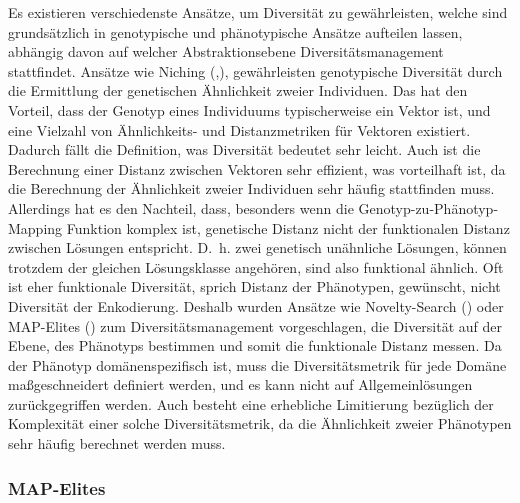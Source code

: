 Es existieren verschiedenste Ansätze, um Diversität zu gewährleisten, welche sind grundsätzlich in genotypische und phänotypische Ansätze aufteilen lassen, abhängig davon auf welcher Abstraktionsebene Diversitätsmanagement stattfindet.
Ansätze wie Niching (\cite{Mahfoud.1996},\cite{Shir.2012}), gewährleisten genotypische Diversität durch die Ermittlung der genetischen Ähnlichkeit zweier Individuen.
Das hat den Vorteil, dass der Genotyp eines Individuums typischerweise ein Vektor ist, und eine Vielzahl von Ähnlichkeits- und Distanzmetriken für Vektoren existiert.
Dadurch fällt die Definition, was Diversität bedeutet sehr leicht.
Auch ist die Berechnung einer Distanz zwischen Vektoren sehr effizient, was vorteilhaft ist, da die Berechnung der Ähnlichkeit zweier Individuen sehr häufig stattfinden muss.
Allerdings hat es den Nachteil, dass, besonders wenn die Genotyp-zu-Phänotyp-Mapping Funktion komplex ist, genetische Distanz nicht der funktionalen Distanz zwischen Lösungen entspricht.
D.~h. zwei genetisch unähnliche Lösungen, können trotzdem der gleichen Lösungsklasse angehören, sind also funktional ähnlich.
Oft ist eher funktionale Diversität, sprich Distanz der Phänotypen, gewünscht, nicht Diversität der Enkodierung.
Deshalb wurden Ansätze wie Novelty-Search (\cite{Lehman.2011}) oder MAP-Elites (\cite{Mouret.4202015}) zum Diversitätsmanagement vorgeschlagen, die Diversität auf der Ebene, des Phänotyps bestimmen und somit die funktionale Distanz messen.
Da der Phänotyp domänenspezifisch ist, muss die Diversitätsmetrik für jede Domäne maßgeschneidert definiert werden, und es kann nicht auf Allgemeinlösungen zurückgegriffen werden.
Auch besteht eine erhebliche Limitierung bezüglich der Komplexität einer solche Diversitätsmetrik, da die Ähnlichkeit zweier Phänotypen sehr häufig berechnet werden muss.

\subsubsection{MAP-Elites}

